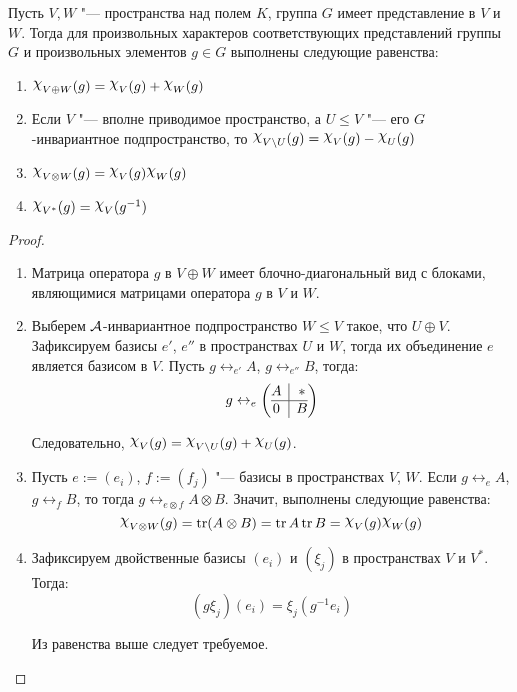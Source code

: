 \begin{proposition}
	Пусть $V, W$ "--- пространства над полем $K$, группа $G$ имеет представление в $V$ и $W$. Тогда для произвольных характеров соответствующих представлений группы $G$ и произвольных элементов $g \in G$ выполнены следующие равенства:
	\begin{enumerate}
		\item $\Chi_{V \oplus W}(g) = \Chi_V(g) + \Chi_W(g)$
		
		\item Если $V$ "--- вполне приводимое пространство, а $U \le V$ "--- его $G$-инвариантное подпространство, то $\Chi_{V \bs U}(g) = \Chi_V(g) - \Chi_U(g)$
		
		\item $\Chi_{V \otimes W}(g) = \Chi_V(g)\Chi_W(g)$
		
		\item $\Chi_{V^*}(g) = \Chi_V(g^{-1})$
		
	\end{enumerate}
	
	\begin{proof}~
		\begin{enumerate}
			\item Матрица оператора $g$ в $V \oplus W$ имеет блочно-диагональный вид с блоками, являющимися матрицами оператора $g$ в $V$ и $W$.
			
			\item Выберем $\mathcal A$-инвариантное подпространство $W \le V$ такое, что $U \oplus V$. Зафиксируем базисы $e'$, $e''$ в пространствах $U$ и $W$, тогда их объединение $e$ является базисом в $V$. Пусть $g \leftrightarrow_{e'} A$, $g \leftrightarrow_{e''} B$, тогда:
			\[g \leftrightarrow_e \left(\begin{array}{@{}c|c@{}}
					A & *\\
					\hline
					0 & B
				\end{array}\right)\]
			
			Следовательно, $\Chi_V(g) = \Chi_{V \bs U}(g) + \Chi_U(g)$.
			
			\item Пусть $e := (e_i)$, $f := (f_j)$ "--- базисы в пространствах $V$, $W$. Если $g \leftrightarrow_{e} A$, $g \leftrightarrow_{f} B$, то тогда $g \leftrightarrow_{e \otimes f} A \otimes B$. Значит, выполнены следующие равенства:
			\[\Chi_{V \otimes W}(g) = \tr(A \otimes B) = \tr{A}\tr{B}=\Chi_V(g)\Chi_W(g)\]
			
			\item Зафиксируем двойственные базисы $(e_i)$ и $(\xi_j)$ в пространствах $V$ и $V^*$. Тогда:
			\[(g\xi_j)(e_i) = \xi_j(g^{-1} e_i)\]
			
			Из равенства выше следует требуемое.\qedhere
		\end{enumerate}
	\end{proof}
\end{proposition}


